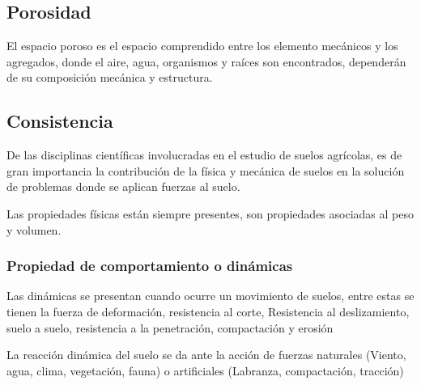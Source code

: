     \subsection{Porosidad}
    El espacio poroso es el espacio comprendido entre los elemento mecánicos y los agregados, donde el aire, agua, organismos y raíces son encontrados, dependerán de su composición mecánica y estructura.
    
\subsection{Consistencia}
De las disciplinas científicas involucradas en el estudio de suelos agrícolas, es de gran importancia la contribución de la física y mecánica de suelos en la solución de problemas donde se aplican fuerzas al suelo.

Las propiedades físicas están siempre presentes, son propiedades asociadas al peso y volumen.

\subsubsection{Propiedad de comportamiento o dinámicas}
Las dinámicas se presentan cuando ocurre un movimiento de suelos, entre estas se tienen la fuerza de deformación, resistencia al corte, Resistencia al deslizamiento, suelo a suelo, resistencia a la penetración, compactación y erosión

La reacción dinámica del suelo se da ante la acción de fuerzas naturales (Viento, agua, clima, vegetación, fauna) o artificiales (Labranza, compactación, tracción)

